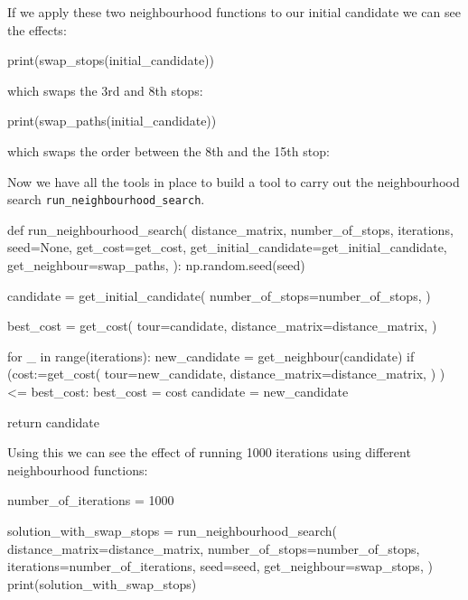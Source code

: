If we apply these two neighbourhood functions to our initial candidate we can
see the effects:

\begin{pyin}
print(swap_stops(initial_candidate))
\end{pyin}

which swaps the 3rd and 8th stops:

\begin{pyout}
[0, 2, 3, 9, 10, 14, 5, 7, 15, 11, 8, 17, 12, 4, 1, 6, 16, 13, 0]
\end{pyout}

\begin{pyin}
print(swap_paths(initial_candidate))
\end{pyin}

which swaps the order between the 8th and the 15th stop:

\begin{pyout}
[0, 2, 7, 9, 10, 14, 5, 3, 6, 1, 4, 12, 17, 8, 11, 15, 16, 13, 0]
\end{pyout}


Now we have all the tools in place to build a tool to carry out the
neighbourhood search \texttt{run_neighbourhood_search}.

\begin{pyin}
def run_neighbourhood_search(
    distance_matrix,
    number_of_stops,
    iterations,
    seed=None,
    get_cost=get_cost,
    get_initial_candidate=get_initial_candidate,
    get_neighbour=swap_paths,
):
    np.random.seed(seed)

    candidate = get_initial_candidate(
        number_of_stops=number_of_stops,
    )

    best_cost = get_cost(
        tour=candidate,
        distance_matrix=distance_matrix,
    )

    for _ in range(iterations):
        new_candidate = get_neighbour(candidate)
        if (cost:=get_cost(
                    tour=new_candidate,
                    distance_matrix=distance_matrix,
                  )
            ) <= best_cost:
            best_cost = cost
            candidate = new_candidate

    return candidate
\end{pyin}

Using this we can see the effect of running 1000 iterations using different
neighbourhood functions:


\begin{pyin}
number_of_iterations = 1000

solution_with_swap_stops = run_neighbourhood_search(
    distance_matrix=distance_matrix,
    number_of_stops=number_of_stops,
    iterations=number_of_iterations,
    seed=seed,
    get_neighbour=swap_stops,
)
print(solution_with_swap_stops)
\end{pyin}

